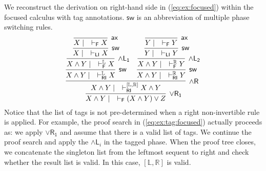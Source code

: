 \documentclass[submission,copyright,creativecommons]{eptcs}
\theoremstyle{definition}
\newcommand{\andlone}{\land \mathsf{L_{1}}}
\newcommand{\andltwo}{\land \mathsf{L_{2}}}
\newcommand{\andli}{\land \mathsf{L}_{i}}
\newcommand{\andr}{\land \mathsf{R}}
\newcommand{\orrone}{\lor \mathsf{R_{1}}}
\newcommand{\ax}{\mathsf{ax}}
\newcommand{\RI}{\mathsf{RI}}
\newcommand{\LI}{\mathsf{LI}}
\newcommand{\F}{\mathsf{F}}
\newcommand{\sw}{\mathsf{sw}}
\newcommand{\tL}{\mathbb{L}}
\newcommand{\tR}{\mathbb{R}}
\begin{document}
We reconstruct the derivation on right-hand side in (\ref{eq:ex:focused}) within the focused calculus with tag annotations.
$\sw$ is an abbreviation of multiple phase switching rules.
\begin{equation}\label{eq:ex:tag:focused}
  \infer[\orrone]{X \land Y \mid \quad \vdash_{\F} (X \land Y) \lor Z}{
    \infer[\andr]{X \land Y \mid \quad \vdash^{[ \tL , \tR ]}_{\RI} X \land Y}{
      \infer[\sw]{X \land Y \mid \quad \vdash^{\tL}_{\RI} X}{
        \infer[\andlone]{X \land Y \mid \quad \vdash^{\tL}_{\F} X}{
          \infer[\sw]{X \mid \quad \vdash_{\LI} X}{
            \infer[\ax]{X \mid \quad \vdash_{\F} X}{}
          }
        }
      }
      &
      \infer[\sw]{X \land Y \mid \quad \vdash^{\tR}_{\RI} Y}{
        \infer[\andltwo]{X \land Y \mid \quad \vdash^{\tR}_{\F} Y}{
          \infer[\sw]{Y \mid \quad \vdash_{\LI} Y}{
            \infer[\ax]{Y \mid \quad \vdash_{\F} Y}{}
          }
        }
      }
    }
  }
\end{equation}
Notice that the list of tags is not pre-determined when a right non-invertible rule is applied.
For example, the proof search in (\ref{eq:ex:tag:focused}) actually proceeds as: we apply $\orrone$ and assume that there is a valid list of tags. We continue the proof search and apply the $\andli$ in the tagged phase. When the proof tree closes, we concatenate the singleton list from the leftmost sequent to right and check whether the result list is valid.
In this case, $[ \tL , \tR ]$ is valid.
\end{document}
